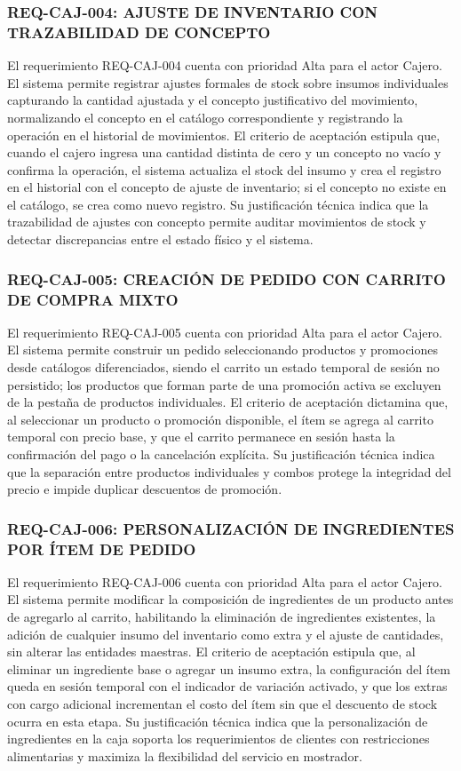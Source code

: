 \subsubsection{REQ-CAJ-004: AJUSTE DE INVENTARIO CON TRAZABILIDAD DE CONCEPTO}
El requerimiento REQ-CAJ-004 cuenta con prioridad Alta para el actor Cajero. El sistema permite registrar ajustes formales de stock sobre insumos individuales capturando la cantidad ajustada y el concepto justificativo del movimiento, normalizando el concepto en el catálogo correspondiente y registrando la operación en el historial de movimientos. El criterio de aceptación estipula que, cuando el cajero ingresa una cantidad distinta de cero y un concepto no vacío y confirma la operación, el sistema actualiza el stock del insumo y crea el registro en el historial con el concepto de ajuste de inventario; si el concepto no existe en el catálogo, se crea como nuevo registro. Su justificación técnica indica que la trazabilidad de ajustes con concepto permite auditar movimientos de stock y detectar discrepancias entre el estado físico y el sistema.

\subsubsection{REQ-CAJ-005: CREACIÓN DE PEDIDO CON CARRITO DE COMPRA MIXTO}
El requerimiento REQ-CAJ-005 cuenta con prioridad Alta para el actor Cajero. El sistema permite construir un pedido seleccionando productos y promociones desde catálogos diferenciados, siendo el carrito un estado temporal de sesión no persistido; los productos que forman parte de una promoción activa se excluyen de la pestaña de productos individuales. El criterio de aceptación dictamina que, al seleccionar un producto o promoción disponible, el ítem se agrega al carrito temporal con precio base, y que el carrito permanece en sesión hasta la confirmación del pago o la cancelación explícita. Su justificación técnica indica que la separación entre productos individuales y combos protege la integridad del precio e impide duplicar descuentos de promoción.

\subsubsection{REQ-CAJ-006: PERSONALIZACIÓN DE INGREDIENTES POR ÍTEM DE PEDIDO}
El requerimiento REQ-CAJ-006 cuenta con prioridad Alta para el actor Cajero. El sistema permite modificar la composición de ingredientes de un producto antes de agregarlo al carrito, habilitando la eliminación de ingredientes existentes, la adición de cualquier insumo del inventario como extra y el ajuste de cantidades, sin alterar las entidades maestras. El criterio de aceptación estipula que, al eliminar un ingrediente base o agregar un insumo extra, la configuración del ítem queda en sesión temporal con el indicador de variación activado, y que los extras con cargo adicional incrementan el costo del ítem sin que el descuento de stock ocurra en esta etapa. Su justificación técnica indica que la personalización de ingredientes en la caja soporta los requerimientos de clientes con restricciones alimentarias y maximiza la flexibilidad del servicio en mostrador.

